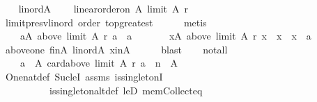 \begin{isabellebody}
\ \ \isamarkupfalse%
\ lin{\isacharunderscore}{\kern0pt}ord{\isacharunderscore}{\kern0pt}A{\isacharcolon}{\kern0pt}\isanewline
\ \ \ \ {\isachardoublequoteopen}linear{\isacharunderscore}{\kern0pt}order{\isacharunderscore}{\kern0pt}on\ A\ {\isacharparenleft}{\kern0pt}limit\ A\ r{\isacharparenright}{\kern0pt}{\isachardoublequoteclose}\isanewline
\ \ \ \ \isamarkupfalse%
\ limit{\isacharunderscore}{\kern0pt}presv{\isacharunderscore}{\kern0pt}lin{\isacharunderscore}{\kern0pt}ord\ order\ top{\isacharunderscore}{\kern0pt}greatest\isanewline
\ \ \ \ \isamarkupfalse%
\ metis\isanewline
\ \ \isamarkupfalse%
\isanewline
\ \ \ \ {\isachardoublequoteopen}{\isasymexists}a{\isasymin}A{\isachardot}{\kern0pt}\ above\ {\isacharparenleft}{\kern0pt}limit\ A\ r{\isacharparenright}{\kern0pt}\ a\ {\isacharequal}{\kern0pt}\ {\isacharbraceleft}{\kern0pt}a{\isacharbraceright}{\kern0pt}\ {\isasymand}\isanewline
\ \ \ \ \ \ {\isacharparenleft}{\kern0pt}{\isasymforall}x{\isasymin}A{\isachardot}{\kern0pt}\ above\ {\isacharparenleft}{\kern0pt}limit\ A\ r{\isacharparenright}{\kern0pt}\ x\ {\isacharequal}{\kern0pt}\ {\isacharbraceleft}{\kern0pt}x{\isacharbraceright}{\kern0pt}\ {\isasymlongrightarrow}\ x\ {\isacharequal}{\kern0pt}\ a{\isacharparenright}{\kern0pt}{\isachardoublequoteclose}\isanewline
\ \ \ \ \isamarkupfalse%
\ above{\isacharunderscore}{\kern0pt}one\ fin{\isacharunderscore}{\kern0pt}A\ lin{\isacharunderscore}{\kern0pt}ord{\isacharunderscore}{\kern0pt}A\ x{\isacharunderscore}{\kern0pt}in{\isacharunderscore}{\kern0pt}A\isanewline
\ \ \ \ \isamarkupfalse%
\ blast\isanewline
\ \ \isamarkupfalse%
\ not{\isacharunderscore}{\kern0pt}all{\isacharcolon}{\kern0pt}\isanewline
\ \ \ \ {\isachardoublequoteopen}{\isacharbraceleft}{\kern0pt}a\ {\isasymin}\ A{\isachardot}{\kern0pt}\ card{\isacharparenleft}{\kern0pt}above\ {\isacharparenleft}{\kern0pt}limit\ A\ r{\isacharparenright}{\kern0pt}\ a{\isacharparenright}{\kern0pt}\ {\isachargreater}{\kern0pt}\ n{\isacharbraceright}{\kern0pt}\ {\isasymnoteq}\ A{\isachardoublequoteclose}\isanewline
\ \ \ \ \isamarkupfalse%
\ One{\isacharunderscore}{\kern0pt}nat{\isacharunderscore}{\kern0pt}def\ Suc{\isacharunderscore}{\kern0pt}leI\ assms{\isacharparenleft}{\kern0pt}{}{\isacharparenright}{\kern0pt}\ is{\isacharunderscore}{\kern0pt}singletonI\isanewline
\ \ \ \ \ \ \ \ \ \ is{\isacharunderscore}{\kern0pt}singleton{\isacharunderscore}{\kern0pt}altdef\ leD\ mem{\isacharunderscore}{\kern0pt}Collect{\isacharunderscore}{\kern0pt}eq\isanewline

\end{isabellebody}
